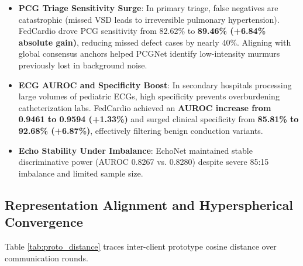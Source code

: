 \documentclass[conference]{IEEEtran}
\begin{document}
\begin{itemize}
    \item \textbf{PCG Triage Sensitivity Surge}: In primary triage, false negatives are catastrophic (missed VSD leads to irreversible pulmonary hypertension). FedCardio drove PCG sensitivity from 82.62\% to \textbf{89.46\% (+6.84\% absolute gain)}, reducing missed defect cases by nearly 40\%. Aligning with global consensus anchors helped PCGNet identify low-intensity murmurs previously lost in background noise.
    \item \textbf{ECG AUROC and Specificity Boost}: In secondary hospitals processing large volumes of pediatric ECGs, high specificity prevents overburdening catheterization labs. FedCardio achieved an \textbf{AUROC increase from 0.9461 to 0.9594 (+1.33\%)} and surged clinical specificity from \textbf{85.81\% to 92.68\% (+6.87\%)}, effectively filtering benign conduction variants.
    \item \textbf{Echo Stability Under Imbalance}: EchoNet maintained stable discriminative power (AUROC 0.8267 vs. 0.8280) despite severe 85:15 imbalance and limited sample size.
\end{itemize}

\subsection{Representation Alignment and Hyperspherical Convergence}
Table \ref{tab:proto_distance} traces inter-client prototype cosine distance over communication rounds.

\begin{table}[htbp]
\centering
\caption{Evolution of Inter-Client Prototype Cosine Distance}
\label{tab:proto_distance}
\end{table}
\end{document}
